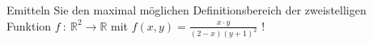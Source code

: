 \item 
Emitteln Sie den maximal möglichen Definitionsbereich der zweistelligen Funktion $f\ :\ \mathbb{R}^2\rightarrow \mathbb{R}$ mit $f(x,y)=\frac{x \cdot y}{(2-x)(y+1)^2}$ !

